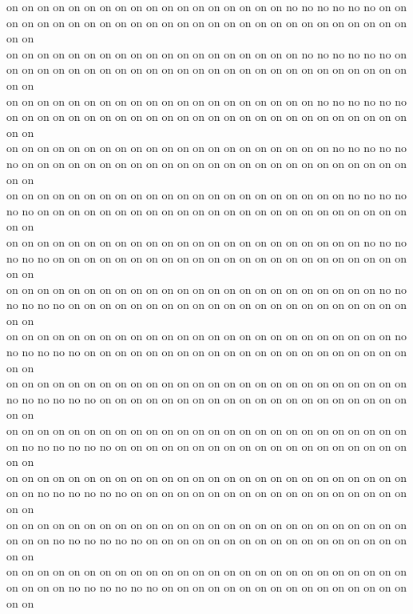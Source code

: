 on on on on on on on on on on on on on on on on on on no no no no no no on on on on on on on on on on on on on on on on on on on on on on on on on on on on on on\\
on on on on on on on on on on on on on on on on on on on no no no no no no on on on on on on on on on on on on on on on on on on on on on on on on on on on on on\\
on on on on on on on on on on on on on on on on on on on on no no no no no no on on on on on on on on on on on on on on on on on on on on on on on on on on on on\\
on on on on on on on on on on on on on on on on on on on on on no no no no no no on on on on on on on on on on on on on on on on on on on on on on on on on on on\\
on on on on on on on on on on on on on on on on on on on on on on no no no no no no on on on on on on on on on on on on on on on on on on on on on on on on on on\\
on on on on on on on on on on on on on on on on on on on on on on on no no no no no no on on on on on on on on on on on on on on on on on on on on on on on on on\\
on on on on on on on on on on on on on on on on on on on on on on on on no no no no no no on on on on on on on on on on on on on on on on on on on on on on on on\\
on on on on on on on on on on on on on on on on on on on on on on on on on no no no no no no on on on on on on on on on on on on on on on on on on on on on on on\\
on on on on on on on on on on on on on on on on on on on on on on on on on on no no no no no no on on on on on on on on on on on on on on on on on on on on on on\\
on on on on on on on on on on on on on on on on on on on on on on on on on on on no no no no no no on on on on on on on on on on on on on on on on on on on on on\\
on on on on on on on on on on on on on on on on on on on on on on on on on on on on no no no no no no on on on on on on on on on on on on on on on on on on on on\\
on on on on on on on on on on on on on on on on on on on on on on on on on on on on on no no no no no no on on on on on on on on on on on on on on on on on on on\\
on on on on on on on on on on on on on on on on on on on on on on on on on on on on on on no no no no no no on on on on on on on on on on on on on on on on on on\\
